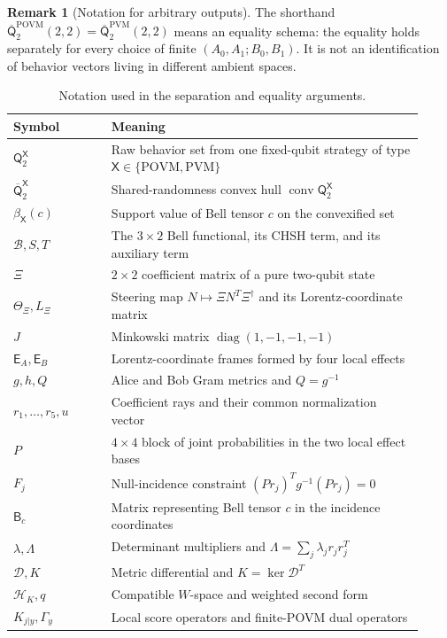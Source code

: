 \documentclass[11pt]{article}
\theoremstyle{definition}
\newtheorem{remark}[theorem]{Remark}
\newcommand{\conv}{\operatorname{conv}}
\newcommand{\Qset}{\mathsf Q}
\newcommand{\Qbar}{\overline{\mathsf Q}}
\newcommand{\POVM}{\mathrm{POVM}}
\newcommand{\PVM}{\mathrm{PVM}}
\newcommand{\Bell}{\mathcal B}
\newcommand{\cD}{\mathcal D}
\begin{document}
\begin{remark}[Notation for arbitrary outputs]
The shorthand
\(\Qbar^{\POVM}_2(2,2)=\Qbar^{\PVM}_2(2,2)\) means an equality schema:
the equality holds separately for every choice of finite
\((A_0,A_1;B_0,B_1)\). It is not an identification of behavior vectors
living in different ambient spaces.
\end{remark}

\begin{table}[p]
\centering
\small
\caption{Notation used in the separation and equality arguments.}
\label{tab:notation}
\begin{tabular}{@{}p{0.22\linewidth}p{0.70\linewidth}@{}}
\toprule
Symbol & Meaning\\
\midrule
\(\Qset^{\mathsf X}_2\) & Raw behavior set from one fixed-qubit strategy of
type \(\mathsf X\in\{\POVM,\PVM\}\)\\
\(\Qbar^{\mathsf X}_2\) & Shared-randomness convex hull
\(\conv\Qset^{\mathsf X}_2\)\\
\(\beta_{\mathsf X}(c)\) & Support value of Bell tensor \(c\) on the
convexified set\\
\(\Bell,S,T\) & The \(3\times2\) Bell functional, its CHSH term, and its
auxiliary term\\
\(\Xi\) & \(2\times2\) coefficient matrix of a pure two-qubit state\\
\(\Theta_\Xi,L_\Xi\) & Steering map \(N\mapsto\Xi N^T\Xi^\dagger\) and its
Lorentz-coordinate matrix\\
\(J\) & Minkowski matrix \(\operatorname{diag}(1,-1,-1,-1)\)\\
\(\mathsf E_A,\mathsf E_B\) & Lorentz-coordinate frames formed by four local
effects\\
\(g,h,Q\) & Alice and Bob Gram metrics and \(Q=g^{-1}\)\\
\(r_1,\ldots,r_5,u\) & Coefficient rays and their common normalization vector\\
\(P\) & \(4\times4\) block of joint probabilities in the two local effect
bases\\
\(F_j\) & Null-incidence constraint
\((Pr_j)^Tg^{-1}(Pr_j)=0\)\\
\(\mathsf B_c\) & Matrix representing Bell tensor \(c\) in the incidence
coordinates\\
\(\lambda,\Lambda\) & Determinant multipliers and
\(\Lambda=\sum_j\lambda_jr_jr_j^T\)\\
\(\cD,K\) & Metric differential and \(K=\ker\cD^T\)\\
\(\mathcal H_K,q\) & Compatible \(W\)-space and weighted second form\\
\(K_{j|y},\Gamma_y\) & Local score operators and finite-POVM dual operators\\
\bottomrule
\end{tabular}
\end{table}
\end{document}
